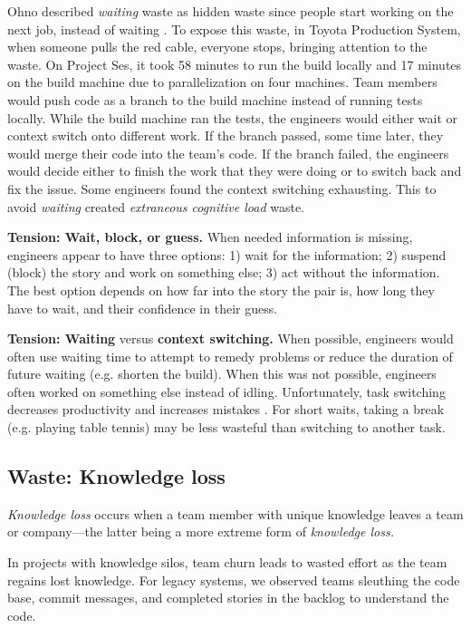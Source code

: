 Ohno described \textit{waiting} waste as hidden waste since people start working on the next job, instead of waiting \cite{OhnoToyotaProductionSystem}. To expose this waste, in Toyota Production System, when someone pulls the red cable, everyone stops, bringing attention to the waste. On Project Ses, it took 58 minutes to run the build locally and 17 minutes on the build machine due to parallelization on four machines. Team members would push code as a branch to the build machine instead of running tests locally. While the build machine ran the tests, the engineers would either wait or context switch onto different work. If the branch passed, some time later, they would merge their code into the team's code. If the branch failed, the engineers would decide either to finish the work that they were doing or to switch back and fix the issue. Some engineers found the context switching exhausting. This  to avoid \textit{waiting} created \textit{extraneous cognitive load} waste.

\textbf{Tension: Wait, block, or guess.}
When needed information is missing, engineers appear to have three options: 1) wait for the information; 2) suspend (block) the story and work on something else; 3) act without the information. The best option depends on how far into the story the pair is, how long they have to wait, and their confidence in their guess.

\textbf{Tension: Waiting} versus \textbf{context switching.}
When possible, engineers would often use waiting time to attempt to remedy problems or reduce the duration of future waiting (e.g. shorten the build). When this was not possible, engineers often worked on something else instead of idling. Unfortunately, task switching decreases productivity and increases mistakes \cite{MonsellTaskSwitching}. For short waits, taking a break (e.g. playing table tennis) may be less wasteful than switching to another task. 

\subsection{Waste: Knowledge loss}
\textit{Knowledge loss} occurs when a team member with unique knowledge leaves a team or company---the latter being a more extreme form of \textit{knowledge loss.}

In projects with knowledge silos, team churn leads to wasted effort as the team regains lost knowledge. For legacy systems, we observed teams sleuthing the code base, commit messages, and completed stories in the backlog to understand the code.  

